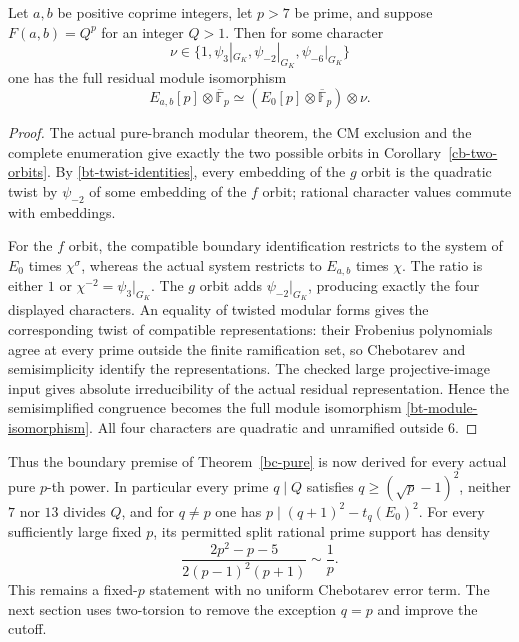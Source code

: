 \begin{theorem}
\label{bt-pure-module}
Let $a,b$ be positive coprime integers, let $p>7$ be prime, and
suppose $F(a,b)=Q^p$ for an integer $Q>1$. Then for some character
\[
 \nu\in\{1,\psi_3|_{G_K},\psi_{-2}|_{G_K},\psi_{-6}|_{G_K}\}
\]
one has the full residual module isomorphism
\begin{equation}\label{bt-module-isomorphism}
 E_{a,b}[p]\otimes\overline{\mathbb F}_p
 \simeq (E_0[p]\otimes\overline{\mathbb F}_p)\otimes\nu.
\end{equation}
\end{theorem}
\begin{proof}
The actual pure-branch modular theorem, the CM exclusion and the
complete enumeration give exactly the two possible orbits in
Corollary~\ref{cb-two-orbits}. By \eqref{bt-twist-identities}, every
embedding of the $g$ orbit is the quadratic twist by $\psi_{-2}$ of
some embedding of the $f$ orbit; rational character values commute
with embeddings.

For the $f$ orbit, the compatible boundary identification restricts
to the system of $E_0$ times $\chi^\sigma$, whereas the actual system
restricts to $E_{a,b}$ times $\chi$. The ratio is either $1$ or
$\chi^{-2}=\psi_3|_{G_K}$. The $g$ orbit adds
$\psi_{-2}|_{G_K}$, producing exactly the four displayed characters.
An equality of twisted modular forms gives the corresponding twist
of compatible representations: their Frobenius polynomials agree at
every prime outside the finite ramification set, so Chebotarev and
semisimplicity identify the representations. The checked large
projective-image input gives absolute irreducibility of the actual
residual representation. Hence the semisimplified congruence becomes
the full module isomorphism \eqref{bt-module-isomorphism}.
All four characters are quadratic and unramified outside $6$.
\end{proof}

Thus the boundary premise of Theorem~\ref{bc-pure} is now derived
for every actual pure $p$-th power. In particular every prime $q\mid Q$
satisfies $q\ge(\sqrt p-1)^2$, neither $7$ nor $13$ divides $Q$,
and for $q\ne p$ one has $p\mid(q+1)^2-t_q(E_0)^2$.
For every sufficiently large fixed $p$, its permitted split rational
prime support has density
\[
 \frac{2p^2-p-5}{2(p-1)^2(p+1)}\sim\frac1p.
\]
This remains a fixed-$p$ statement with no uniform Chebotarev error
term. The next section uses two-torsion to remove the exception $q=p$
and improve the cutoff.

